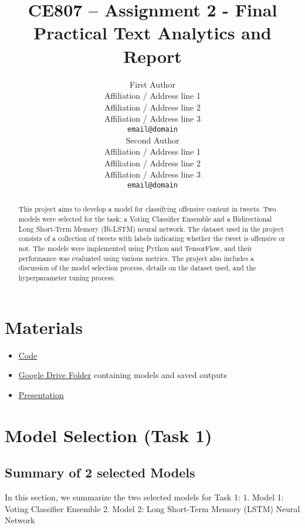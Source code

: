 \documentclass[11pt]{article}
\title{CE807 – Assignment 2 - Final Practical Text Analytics and Report}
\author{First Author \\
  Affiliation / Address line 1 \\
  Affiliation / Address line 2 \\
  Affiliation / Address line 3 \\
  \texttt{email@domain} \\\And
  Second Author \\
  Affiliation / Address line 1 \\
  Affiliation / Address line 2 \\
  Affiliation / Address line 3 \\
  \texttt{email@domain} \\}
\begin{document}
\maketitle
\begin{abstract}
This project aims to develop a model for classifying offensive content in tweets. Two models were selected for the task: a Voting Classifier Ensemble and a Bidirectional Long Short-Term Memory (Bi-LSTM) neural network. The dataset used in the project consists of a collection of tweets with labels indicating whether the tweet is offensive or not. The models were implemented using Python and TensorFlow, and their performance was evaluated using various metrics. The project also includes a discussion of the model selection process, details on the dataset used, and the hyperparameter tuning process. 

\end{abstract}




\section{Materials}

\begin{itemize}
    \item \href{https://colab.research.google.com/drive/1Jxc1w22cM0kF2e2kJZIoybR8lCRQr0ht?usp=sharing}{Code}
    \item \href{https://drive.google.com/drive/folders/1-FvWa2H8CADOwQRRJ2ulPqucCszQ3LPE?usp=share_link}{Google Drive Folder}  containing models and saved outputs
    \item \href{https://essex-university.zoom.us/rec/share/4gsDeMsOx2ZepWpR3_6_GfLUxIjoaSRJYe52QOPbR5b-TXBpC7-1ZX9eJAMU7VG-.TWbEH7soVLcBb_89?startTime=1682416943000}{Presentation}
\end{itemize}





\section{Model Selection (Task 1)}
\subsection{Summary of 2 selected Models}
In this section, we summarize the two selected models for Task 1:
1.	Model 1: Voting Classifier Ensemble
2.	Model 2: Long Short-Term Memory (LSTM) Neural Network
\end{document}
